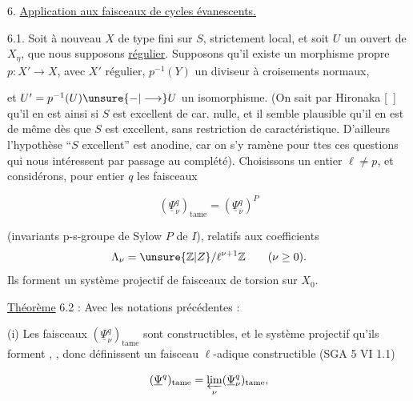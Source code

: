 
6. \uline{Application aux faisceaux de cycles évanescents.}

6.1. Soit à nouveau $X$ de type fini sur $S$,  strictement local, et soit $U$ un ouvert de $X_\eta$, que nous supposons \uline{régulier}.  Supposons qu'il existe un morphisme propre $p:X'\to X$,  avec $X'$ régulier, $p^{-1}(Y)$ un diviseur à croisements normaux,


et $U'=p^{-1}(U)\unsure{{-}|\longrightarrow}U$ un isomorphisme. (On sait par Hironaka [\ ] qu'il en est ainsi si $S$ est excellent de car. nulle, et  il semble plausible qu'il en est de même dès que $S$ est excellent, sans restriction de caractéristique. D'ailleurs l'hypothèse ``$S$ excellent'' est anodine, car on s'y ramène pour ttes ces questions qui nous intéressent par passage au complété).  Choisissons un entier $\ell\ne p$, et considérons, pour  entier $q$  les faisceaux

\[
\boxed{(\underline{\Psi}_\nu^q)_{\mathrm{tame}}=(\underline{\Psi}_\nu^q)^P}
\tag*{6.1.1}
\]

(invariants   p-s-groupe de Sylow $P$ de $I$),  relatifs aux coefficients
\[
\Lambda_\nu=\unsure{\mathbb{Z}|Z}/\ell^{\nu+1}\mathbb{Z}\qquad(\nu\geq0).
\]
 Ils forment un système projectif de faisceaux de torsion sur $X_0$.

\uline{Théorème} 6.2 : Avec les notations précédentes :

(i) Les faisceaux $(\underline{\Psi}_\nu^q)_{\mathrm{tame}}$ sont constructibles, et  le système projectif qu'ils forment  , , donc définissent un faisceau $\ell$-adique constructible (SGA 5 VI 1.1)

\[
(\underline{\Psi}^q)_{\mathrm{tame}}=\varprojlim_\nu(\underline{\Psi}_\nu^q)_{\mathrm{tame}},
\]
